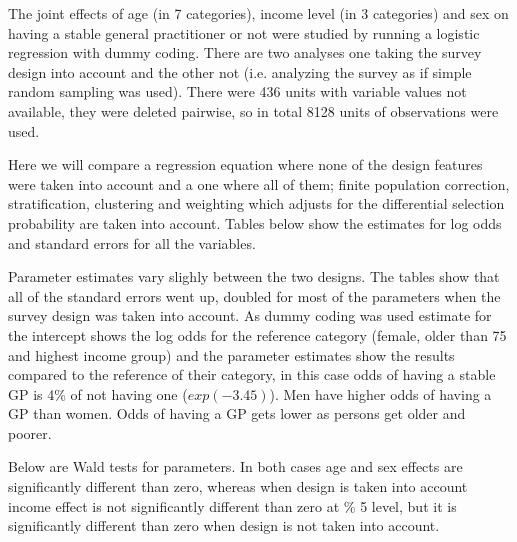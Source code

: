 The joint effects of age (in 7 categories), income level (in 3 categories) and sex on having a stable general practitioner or not were studied by running a logistic regression with dummy coding. There are two analyses one taking the survey design into account and the other not (i.e. analyzing the survey as if simple random sampling was used). There were 436 units with variable values not available, they were deleted pairwise, so in total 8128 units of observations were used.

Here we will compare a regression equation where none of the design features were taken into account and a one where all of them; finite population correction, stratification, clustering and weighting which adjusts for the differential selection probability are taken into account. Tables below show the estimates for log odds and standard errors for all the variables.





Parameter estimates vary slighly between the two designs. The tables show that all of the standard errors went up, doubled for most of the parameters when the survey design was taken into account. As dummy coding was used estimate for the intercept shows the log odds for the reference category (female, older than 75 and highest income group) and the parameter estimates show the results compared to the reference of their category, in this case odds of having a stable GP is 4\% of not having one ($exp(-3.45)$). Men have higher odds of having a GP than women. Odds of having a GP gets lower as persons get older and poorer.

Below are Wald tests for parameters. In both cases age and sex effects are significantly different than zero, whereas when design is taken into account income effect is not significantly different than zero at \% 5 level, but it is significantly different than zero when design is not taken into account. 




